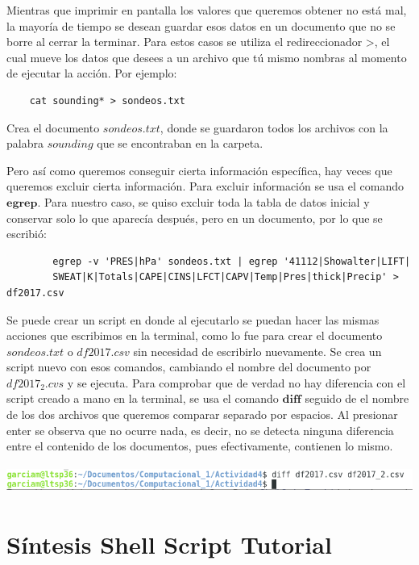 \documentclass{article}
\begin{document}
Mientras que imprimir en pantalla los valores que queremos obtener no está mal, la mayoría de tiempo se desean guardar esos datos en un documento que no se borre al cerrar la terminar. Para estos casos se utiliza el redireccionador $\textbf{>}$, el cual mueve los datos que desees a un archivo que tú mismo nombras al momento de ejecutar la acción. Por ejemplo:

	\begin{verbatim}
	cat sounding* > sondeos.txt
	\end{verbatim}
Crea el documento $sondeos.txt$, donde se guardaron todos los archivos con la palabra $sounding$ que se encontraban en la carpeta.

Pero así como queremos conseguir cierta información específica, hay veces que queremos excluir cierta información. Para excluir información se usa el comando $\textbf{egrep}$. Para nuestro caso, se quiso excluir toda la tabla de datos inicial y conservar solo lo que aparecía después, pero en un documento, por lo que se escribió:

		\begin{verbatim}
        egrep -v 'PRES|hPa' sondeos.txt | egrep '41112|Showalter|LIFT|
        SWEAT|K|Totals|CAPE|CINS|LFCT|CAPV|Temp|Pres|thick|Precip' > df2017.csv
		\end{verbatim}

Se puede crear un script en donde al ejecutarlo se puedan hacer las mismas acciones que escribimos en la terminal, como lo fue para crear el documento $sondeos.txt$ o $df2017.csv$ sin necesidad de escribirlo nuevamente. Se crea un script nuevo con esos comandos, cambiando el nombre del documento por $df2017_2.cvs$ y se ejecuta. Para comprobar que de verdad no hay diferencia con el script creado a mano en la terminal, se usa el comando $\textbf{diff}$ seguido de el nombre de los dos archivos que queremos comparar separado por espacios. Al presionar enter se observa que no ocurre nada, es decir, no se detecta ninguna diferencia entre el contenido de los documentos, pues efectivamente, contienen lo mismo.

    \begin{center}
    \includegraphics[height=0.9cm]{diff.png}
    \end{center}

\section{Síntesis Shell Script Tutorial}
\end{document}
